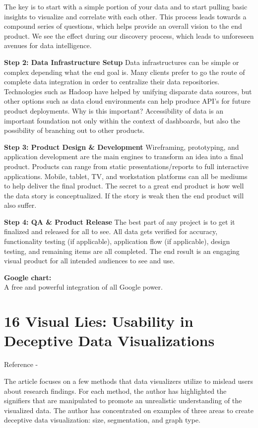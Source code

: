 \documentclass[]{book}
\theoremstyle{definition}
\theoremstyle{definition}
\theoremstyle{definition}
\theoremstyle{remark}
\begin{document}
The key is to start with a simple portion of your data and to start
pulling basic insights to visualize and correlate with each other. This
process leads towards a compound series of questions, which helps
provide an overall vision to the end product. We see the effect during
our discovery process, which leads to unforeseen avenues for data
intelligence.

\textbf{Step 2: Data Infrastructure Setup} Data infrastructures can be
simple or complex depending what the end goal is. Many clients prefer to
go the route of complete data integration in order to centralize their
data repositories. Technologies such as Hadoop have helped by unifying
disparate data sources, but other options such as data cloud
environments can help produce API's for future product deployments. Why
is this important? Accessibility of data is an important foundation not
only within the context of dashboards, but also the possibility of
branching out to other products.

\textbf{Step 3: Product Design \& Development} Wireframing, prototyping,
and application development are the main engines to transform an idea
into a final product. Products can range from static
presentations/reports to full interactive applications. Mobile, tablet,
TV, and workstation platforms can all be mediums to help deliver the
final product. The secret to a great end product is how well the data
story is conceptualized. If the story is weak then the end product will
also suffer.

\textbf{Step 4: QA \& Product Release} The best part of any project is
to get it finalized and released for all to see. All data gets verified
for accuracy, functionality testing (if applicable), application flow
(if applicable), design testing, and remaining items are all completed.
The end result is an engaging visual product for all intended audiences
to see and use.

\textbf{Google chart:}\\
A free and powerful integration of all Google power.

\section{16 Visual Lies: Usability in Deceptive Data
Visualizations}\label{visual-lies-usability-in-deceptive-data-visualizations}

Reference - \citep{visual-lies}

The article focuses on a few methods that data visualizers utilize to
mislead users about research findings. For each method, the author has
highlighted the signifiers that are manipulated to promote an
unrealistic understanding of the visualized data. The author has
concentrated on examples of three areas to create deceptive data
visualization: size, segmentation, and graph type.
\end{document}
